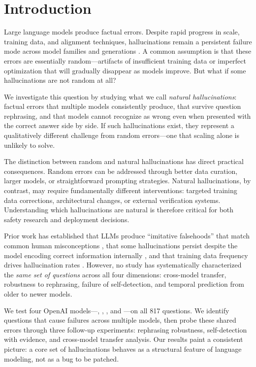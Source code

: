 \section{Introduction}
\label{sec:intro}

Large language models produce factual errors.
Despite rapid progress in scale, training data, and alignment techniques, hallucinations remain a persistent failure mode across model families and generations \citep{lin2022truthfulqa, huang2023survey}.
A common assumption is that these errors are essentially random---artifacts of insufficient training data or imperfect optimization that will gradually disappear as models improve.
But what if some hallucinations are not random at all?

We investigate this question by studying what we call \emph{natural hallucinations}: factual errors that multiple models consistently produce, that survive question rephrasing, and that models cannot recognize as wrong even when presented with the correct answer side by side.
If such hallucinations exist, they represent a qualitatively different challenge from random errors---one that scaling alone is unlikely to solve.

The distinction between random and natural hallucinations has direct practical consequences.
Random errors can be addressed through better data curation, larger models, or straightforward prompting strategies.
Natural hallucinations, by contrast, may require fundamentally different interventions: targeted training data corrections, architectural changes, or external verification systems.
Understanding which hallucinations are natural is therefore critical for both safety research and deployment decisions.

Prior work has established that LLMs produce ``imitative falsehoods'' that match common human misconceptions \citep{lin2022truthfulqa}, that some hallucinations persist despite the model encoding correct information internally \citep{orgad2024llmsknow, simhi2025choke}, and that training data frequency drives hallucination rates \citep{miao2025hallucination}.
However, no study has systematically characterized the \emph{same set of questions} across all four dimensions: cross-model transfer, robustness to rephrasing, failure of self-detection, and temporal prediction from older to newer models.

We test four OpenAI models---\gptfourone, \gptfouro, \gptfouromini, and \gptthreefive---on all 817 \truthfulqa questions.
We identify questions that cause failures across multiple models, then probe these shared errors through three follow-up experiments: rephrasing robustness, self-detection with evidence, and cross-model transfer analysis.
Our results paint a consistent picture: a core set of hallucinations behaves as a structural feature of language modeling, not as a bug to be patched.

